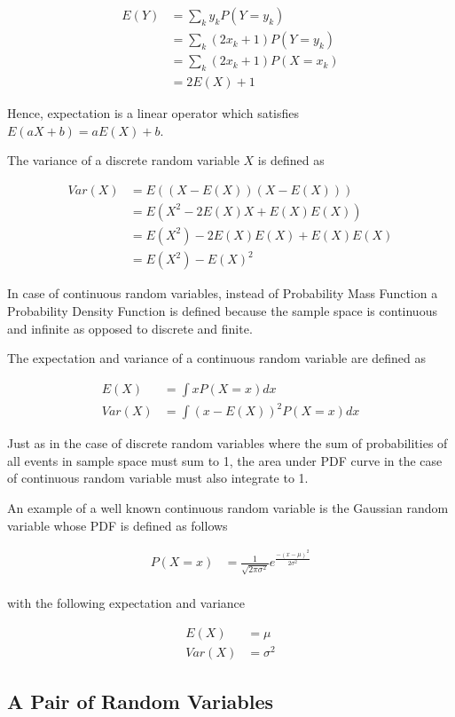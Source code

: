 \documentclass[11pt, a4paper]{article}
\begin{document}
\begin{align*}
	E(Y) & = \sum_k y_k P(Y=y_k)         \\ 
	     & = \sum_k (2 x_k + 1) P(Y=y_k) \\
	     & = \sum_k (2x_k + 1) P(X=x_k)  \\
	     & = 2E(X) + 1                   
\end{align*}

Hence, expectation is a linear operator which satisfies $E(aX + b) = aE(X) + b$.

The variance of a discrete random variable $X$ is defined as

\begin{align*}
	Var(X) & = E((X-E(X))(X-E(X)))           \\
	       & = E(X^2 - 2E(X)X + E(X)E(X))    \\
	       & = E(X^2) - 2E(X)E(X) + E(X)E(X) \\
	       & = E(X^2) - E(X)^2               
\end{align*}

In case of continuous random variables, instead of Probability Mass Function a Probability Density Function is defined because the sample space is continuous and infinite as opposed to discrete and finite.

The expectation and variance of a continuous random variable are defined as

\begin{align*}
	E(X)   & = \int x P(X=x) dx            \\
	Var(X) & = \int (x - E(X))^2 P(X=x) dx 
\end{align*}

Just as in the case of discrete random variables where the sum of probabilities of all events in sample space must sum to 1, the area under PDF curve in the case of continuous random variable must also integrate to 1.

An example of a well known continuous random variable is the Gaussian random variable whose PDF is defined as follows

\begin{align*}
	P(X=x) & = \frac{1}{\sqrt{2\pi\sigma^2}} e^{\frac{-(x-\mu)^2}{2\sigma^2}} \\
\end{align*}

with the following expectation and variance

\begin{align*}
	E(X)   & = \mu      \\
	Var(X) & = \sigma^2 
\end{align*}

\subsection{A Pair of Random Variables}
\end{document}
